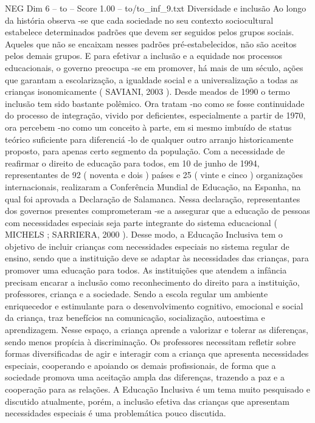 \begin{textsample}{NEG Dim 6 – to – Score 1.00 – to/to\_inf\_9.txt}  \label{ex:f6_neg_112}
Diversidade e inclusão Ao longo da história observa -se que cada sociedade no seu contexto sociocultural estabelece determinados padrões que devem ser seguidos pelos grupos sociais.
Aqueles que não se encaixam nesses padrões pré-estabelecidos, não são aceitos pelos demais grupos.
E para efetivar a inclusão e a equidade nos processos educacionais, o governo preocupa -se em promover, há mais de um século, ações que garantam a escolarização, a igualdade social e a universalização a todas as crianças isonomicamente ( SAVIANI, 2003 ).
Desde meados de 1990 o termo inclusão tem sido bastante polêmico.
Ora tratam -no como se fosse continuidade do processo de integração, vivido por deficientes, especialmente a partir de 1970, ora percebem -no como um conceito à parte, em si mesmo imbuído de status teórico suficiente para diferenciá -lo de qualquer outro arranjo historicamente proposto, para apenas certo segmento da população.
Com a necessidade de reafirmar o direito de educação para todos, em 10 de junho de 1994, representantes de 92 ( noventa e dois ) países e 25 ( vinte e cinco ) organizações internacionais, realizaram a Conferência Mundial de Educação, na Espanha, na qual foi aprovada a Declaração de Salamanca.
Nessa declaração, representantes dos governos presentes comprometeram -se a assegurar que a educação de pessoas com necessidades especiais seja parte integrante do sistema educacional ( MICHELS ; SARRIERA, 2000 ).
Desse modo, a Educação Inclusiva tem o objetivo de incluir crianças com necessidades especiais no sistema regular de ensino, sendo que a instituição deve se adaptar às necessidades das crianças, para promover uma educação para todos.
As instituições que atendem a infância precisam encarar a inclusão como reconhecimento do direito para a instituição, professores, criança e a sociedade.
Sendo a escola regular um ambiente enriquecedor e estimulante para o desenvolvimento cognitivo, emocional e social da criança, traz benefícios na comunicação, socialização, autoestima e aprendizagem.
Nesse espaço, a criança aprende a valorizar e tolerar as diferenças, sendo menos propícia à discriminação.
Os professores necessitam refletir sobre formas diversificadas de agir e interagir com a criança que apresenta necessidades especiais, cooperando e apoiando os demais profissionais, de forma que a sociedade promova uma aceitação ampla das diferenças, trazendo a paz e a cooperação para as relações.
A Educação Inclusiva é um tema muito pesquisado e discutido atualmente, porém, a inclusão efetiva das crianças que apresentam necessidades especiais é uma problemática pouco discutida.

\end{textsample}
